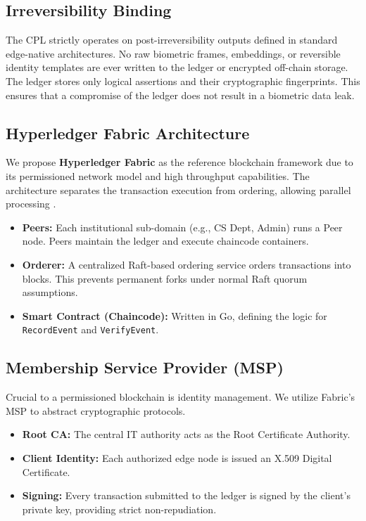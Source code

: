 \documentclass[conference]{IEEEtran}
\begin{document}
\subsection{Irreversibility Binding}
The CPL strictly operates on post-irreversibility outputs defined in standard edge-native architectures. No raw biometric frames, embeddings, or reversible identity templates are ever written to the ledger or encrypted off-chain storage. The ledger stores only logical assertions and their cryptographic fingerprints. This ensures that a compromise of the ledger does not result in a biometric data leak.

\subsection{Hyperledger Fabric Architecture}



We propose \textbf{Hyperledger Fabric} as the reference blockchain framework due to its permissioned network model and high throughput capabilities. The architecture separates the transaction execution from ordering, allowing parallel processing \cite{b14}.

\begin{itemize}
    \item \textbf{Peers:} Each institutional sub-domain (e.g., CS Dept, Admin) runs a Peer node. Peers maintain the ledger and execute chaincode containers.
    \item \textbf{Orderer:} A centralized Raft-based ordering service orders transactions into blocks. This prevents permanent forks under normal Raft quorum assumptions.
    \item \textbf{Smart Contract (Chaincode):} Written in Go, defining the logic for \texttt{RecordEvent} and \texttt{VerifyEvent}.
\end{itemize}

\subsection{Membership Service Provider (MSP)}
Crucial to a permissioned blockchain is identity management. We utilize Fabric's MSP to abstract cryptographic protocols.
\begin{itemize}
    \item \textbf{Root CA:} The central IT authority acts as the Root Certificate Authority.
    \item \textbf{Client Identity:} Each authorized edge node is issued an X.509 Digital Certificate.
    \item \textbf{Signing:} Every transaction submitted to the ledger is signed by the client's private key, providing strict non-repudiation.
\end{itemize}
\end{document}
